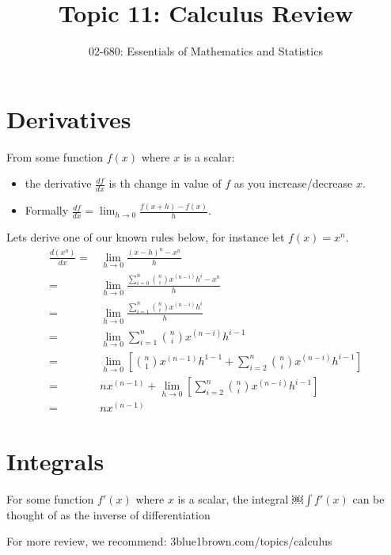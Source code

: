 


\title{Topic 11: Calculus Review}
\author{02-680: Essentials of Mathematics and Statistics}


\maketitle

\section{Derivatives}
 From some function $f(x)$ where $x$ is a scalar:
 \begin{itemize}
 \item the derivative $\displaystyle\frac{df}{dx}$ is th change in value of $f$ as you increase/decrease $x$.
 \item Formally $\displaystyle\frac{df}{dx}=\lim_{h\rightarrow 0}\frac{f\left(x+h\right) - f(x)}{h}$.
 \end{itemize}
 
 Lets derive one of our known rules below, for instance let $f(x)=x^n$. 
 \begin{align}
 \frac{d(x^n)}{dx}=&\lim_{h\rightarrow 0}\frac{(x-h)^n - x^n}{h}\\
 =& \lim_{h\rightarrow 0}\frac{\sum_{i=0}^n {n \choose i} x^{(n-i)}h^i - x^n}{h}\\
 =& \lim_{h\rightarrow 0}\frac{\sum_{i=1}^{n} {n \choose i} x^{(n-i)}h^i}{h}\\
 =& \lim_{h\rightarrow 0}\sum_{i=1}^{n} {n \choose i} x^{(n-i)}h^{i-1}\\
 =& \lim_{h\rightarrow 0} \left[{n \choose 1}x^{(n-1)}h^{1-1} + \sum_{i=2}^{n} {n \choose i} x^{(n-i)}h^{i-1}\right]\\
 =& nx^{(n-1)} + \lim_{h\rightarrow 0} \left[\sum_{i=2}^{n} {n \choose i} x^{(n-i)}h^{i-1}\right]\\
 =& nx^{(n-1)}
 \end{align}
 

\section{Integrals}
For some function $f'(x)$ where $x$ is a scalar, 
the integral $\displaystyle￼\int f'(x)$ can be thought of as the inverse of differentiation

For more review, we recommend: 3blue1brown.com/topics/calculus


